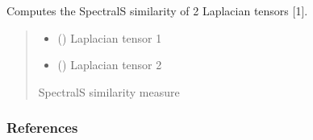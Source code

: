 \documentclass[letterpaper,10pt,english]{sphinxmanual}
\begin{document}
\begin{fulllineitems}
\label{\detokenize{HAT:HAT.multilinalg.SpectralHSimilarity}}
\pysigstartsignatures
{}
\pysigstopsignatures
\sphinxAtStartPar
Computes the Spectral\sphinxhyphen{}S similarity of 2 Laplacian tensors {[}1{]}.
\begin{quote}\begin{description}
\begin{itemize}
\item {} 
\sphinxAtStartPar
{} () \textendash{} Laplacian tensor 1

\item {} 
\sphinxAtStartPar
{} () \textendash{} Laplacian tensor 2

\end{itemize}

\sphinxAtStartPar
Spectral\sphinxhyphen{}S similarity measure

\sphinxAtStartPar
{}

\end{description}\end{quote}
\subsubsection*{References}

\end{fulllineitems}

\end{document}
